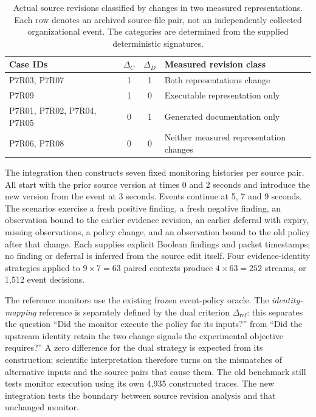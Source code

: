 \documentclass[preprint,11pt]{elsarticle}
\begin{document}
\begin{table}[ht]
\centering\small
\caption{Actual source revisions classified by changes in two measured representations. Each row denotes an archived source-file pair, not an independently collected organizational event. The categories are determined from the supplied deterministic signatures.}\label{tab:revision-pairs}
\begin{tabularx}{\linewidth}{@{}lcc>{\raggedright\arraybackslash}X@{}}\toprule
Case IDs & $\Delta_C$ & $\Delta_D$ & Measured revision class\\\midrule
P7R03, P7R07 & 1 & 1 & Both representations change\\
P7R09 & 1 & 0 & Executable representation only\\
P7R01, P7R02, P7R04, P7R05 & 0 & 1 & Generated documentation only\\
P7R06, P7R08 & 0 & 0 & Neither measured representation changes\\\bottomrule
\end{tabularx}
\end{table}

The integration then constructs seven fixed monitoring histories per source pair. All start with the prior source version at times 0 and 2 seconds and introduce the new version from the event at 3 seconds. Events continue at 5, 7 and 9 seconds. The scenarios exercise a fresh positive finding, a fresh negative finding, an observation bound to the earlier evidence revision, an earlier deferral with expiry, missing observations, a policy change, and an observation bound to the old policy after that change. Each supplies explicit Boolean findings and packet timestamps; no finding or deferral is inferred from the source edit itself. Four evidence-identity strategies applied to $9\times7=63$ paired contexts produce $4\times63=252$ streams, or 1,512 event decisions.

The reference monitors use the existing frozen event-policy oracle. The \emph{identity-mapping} reference is separately defined by the dual criterion $\Delta_{\mathrm{ref}}$: this separates the question ``Did the monitor execute the policy for its inputs?'' from ``Did the upstream identity retain the two change signals the experimental objective requires?'' A zero difference for the dual strategy is expected from its construction; scientific interpretation therefore turns on the mismatches of alternative inputs and the source pairs that cause them. The old benchmark still tests monitor execution using its own 4,935 constructed traces. The new integration tests the boundary between source revision analysis and that unchanged monitor.
\end{document}
